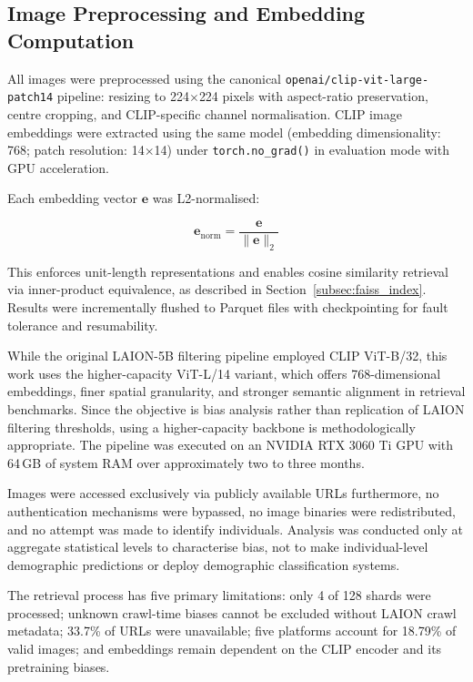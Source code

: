 \subsection{Image Preprocessing and Embedding Computation}
\label{subsec:embedding_computation}

All images were preprocessed using the canonical \texttt{openai/clip-vit-large-patch14} pipeline: resizing to 224$\times$224 pixels with aspect-ratio preservation, centre cropping, and CLIP-specific channel normalisation. CLIP image embeddings were extracted using the same model (embedding dimensionality: 768; patch resolution: 14$\times$14) under \texttt{torch.no\_grad()} in evaluation mode with GPU acceleration.

Each embedding vector $\mathbf{e}$ was L2-normalised:

\[
	\mathbf{e}_{\mathrm{norm}} = \frac{\mathbf{e}}{\|\mathbf{e}\|_2}
\]

This enforces unit-length representations and enables cosine similarity retrieval via inner-product equivalence, as described in Section~\ref{subsec:faiss_index}. Results were incrementally flushed to Parquet files with checkpointing for fault tolerance and resumability.

While the original LAION-5B filtering pipeline employed CLIP ViT-B/32, this work uses the higher-capacity ViT-L/14 variant, which offers 768-dimensional embeddings, finer spatial granularity, and stronger semantic alignment in retrieval benchmarks. Since the objective is bias analysis rather than replication of LAION filtering thresholds, using a higher-capacity backbone is methodologically appropriate. The pipeline was executed on an NVIDIA RTX 3060 Ti GPU with 64\,GB of system RAM over approximately two to three months.

Images were accessed exclusively via publicly available URLs furthermore, no authentication mechanisms were bypassed, no image binaries were redistributed, and no attempt was made to identify individuals. Analysis was conducted only at aggregate statistical levels to characterise bias, not to make individual-level demographic predictions or deploy demographic classification systems.

The retrieval process has five primary limitations: only 4 of 128 shards were processed; unknown crawl-time biases cannot be excluded without LAION crawl metadata; 33.7\% of URLs were unavailable; five platforms account for 18.79\% of valid images; and embeddings remain dependent on the CLIP encoder and its pretraining biases.

